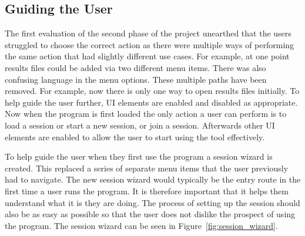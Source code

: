 \subsection{Guiding the User}
\label{sec:guiding}

The first evaluation of the second phase of the project unearthed that the users struggled to choose the correct action as there were multiple ways of performing the same action that had slightly different use cases.  For example, at one point results files could be added via two different menu items.  There was also confusing language in the menu options.  These multiple paths have been removed. For example, now there is only one way to open results files initially.  To help guide the user further, \ac{UI} elements are enabled and disabled as appropriate.  Now when the program is first loaded the only action a user can perform is to load a session or start a new session, or join a session.  Afterwards other \ac{UI} elements are enabled to allow the user to start using the tool effectively.

To help guide the user when they first use the program a session wizard is created.  This replaced a series of separate menu items that the user previously had to navigate. The new session wizard would typically be the entry route in the first time a user runs the program.  It is therefore important that it helps them understand what it is they are doing.  The process of setting up the session should also be as easy as possible so that the user does not dislike the prospect of using the program.  The session wizard can be seen in Figure~\ref{fig:session_wizard}.


